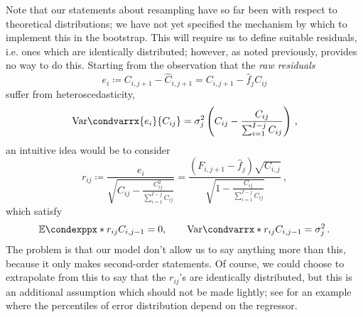 \documentclass[a4paper]{book}
\theoremstyle{plain}
\newcommand{\condexpp}{\mathbb{E}\condexppx}
\newcommand{\condvarr}{\mathrm{Var}\condvarrx}
\begin{document}
Note that our statements about resampling have so far been with respect to theoretical distributions; we have not yet specified the mechanism by which to implement this in the bootstrap. This will require us to define suitable residuals, i.e. ones which are identically distributed; however, as noted previously,  provides no way to do this. Starting from the observation that the \emph{raw residuals}
\begin{equation}
  e_i \coloneqq C_{i, j + 1} - \hat{C}_{i, j + 1} = C_{i, j + 1} - \hat{f}_j C_{ij}
\end{equation}
suffer from heteroscedasticity,
\begin{equation}
  \condvarr{e_i}{C_{ij}} = \sigma^2_j \left( C_{ij} - \frac{C_{ij}}{\sum_{i = 1}^{I - j} C_{ij}} \right) \,,
\end{equation}
an intuitive idea would be to consider
\begin{equation} \label{eq:alt-resids}
  r_{ij} \coloneqq \frac{e_i}{\sqrt{C_{ij} - \frac{C^2_{ij}}{\sum_{i=1}^{I - j} C_{ij}}}} = \frac{(F_{i, j + 1} - \hat{f}_j)\sqrt{C_{i, j}}}{\sqrt{1 - \frac{C_{ij}}{\sum_{i=1}^{I - j} C_{ij}}}} \,,
\end{equation}
which satisfy
\begin{equation}
  \condexpp*{r_{ij}}{C_{i, j - 1}} = 0, 
  \qquad 
  \condvarr*{r_{ij}}{C_{i, j - 1}} = \sigma^2_j \,.
\end{equation}
The problem is that our model don't allow us to say anything more than this, because it only makes second-order statements. Of course, we could choose to extrapolate from this to say that the $r_{ij}$'s are identically distributed, but this is an additional assumption which should not be made lightly; see \cite{efron} for an example where the percentiles of error distribution depend on the regressor.
\end{document}

